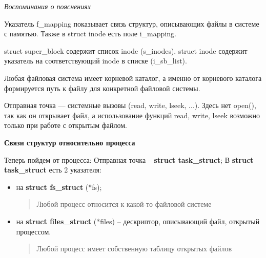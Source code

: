 \textit{Воспоминания о пояснениях}

Указатель f\_mapping показывает связь структур, описывающих файлы в системе с памятью. Также в struct inode есть поле i\_mapping.

struct super\_block содержит список inode (s\_inodes). struct inode содержит указатель на соответствующий inode в списке (i\_sb\_list).

Любая файловая система имеет корневой каталог, а именно от корневого каталога формируется путь к файлу для конкретной файловой системы.

Отправная точка — системные вызовы (read, write, lseek, ...). Здесь нет open(), так как он открывает файл, а использование функций read, write, lseek возможно только при работе с открытым файлом.

\textbf{Связи структур относительно процесса}
\par Теперь пойдем от процесса: Отправная точка -- \textbf{struct task\_struct};
В \textbf{struct task\_struct} есть 2 указателя: 
\begin{itemize}
\item на \textbf{struct fs\_struct} (*fs);
\begin{quote}
Любой процесс относится к какой-то файловой системе
\end{quote}
\item на \textbf{struct files\_struct} (*files) -- дескриптор, описывающий файл, открытый процессом.
\begin{quote}
Любой процесс имеет собственную таблицу открытых файлов
\end{quote}
\end{itemize}

